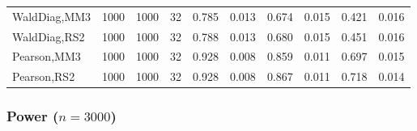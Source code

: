 \documentclass[
]{article}
\begin{document}
\begin{table}[H]
{\begin{tabular}[t]{lrrrrrrlrr}
\hspace{1em}WaldDiag,MM3 & 1000 & 1000 & 32 & 0.785 & 0.013 & 0.674 & 0.015 & 0.421 & 0.016\\
\hspace{1em}WaldDiag,RS2 & 1000 & 1000 & 32 & 0.788 & 0.013 & 0.680 & 0.015 & 0.451 & 0.016\\
\hspace{1em}Pearson,MM3 & 1000 & 1000 & 32 & 0.928 & 0.008 & 0.859 & 0.011 & 0.697 & 0.015\\
\hspace{1em}Pearson,RS2 & 1000 & 1000 & 32 & 0.928 & 0.008 & 0.867 & 0.011 & 0.718 & 0.014\\
\bottomrule
\end{tabular}}
\endgroup{}
\end{table}

\hypertarget{power-n3000-1}{%
\subsubsection{\texorpdfstring{Power
(\(n=3000\))}{Power (n=3000)}}\label{power-n3000-1}}
\end{document}
